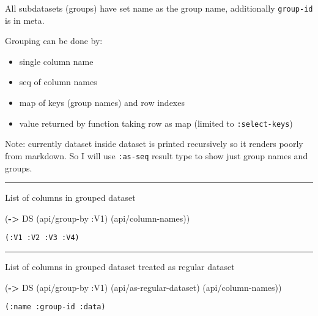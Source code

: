 \documentclass[]{article}
\newenvironment{Shaded}{\begin{snugshade}}{\end{snugshade}}
\newcommand{\KeywordTok}[1]{\textcolor[rgb]{0.13,0.29,0.53}{\textbf{#1}}}
\newcommand{\AttributeTok}[1]{\textcolor[rgb]{0.77,0.63,0.00}{#1}}
\newcommand{\NormalTok}[1]{#1}
\providecommand{\tightlist}{%
  \setlength{\itemsep}{0pt}\setlength{\parskip}{0pt}}
\begin{document}
All subdatasets (groups) have set name as the group name, additionally
\texttt{group-id} is in meta.

Grouping can be done by:

\begin{itemize}
\tightlist
\item
  single column name
\item
  seq of column names
\item
  map of keys (group names) and row indexes
\item
  value returned by function taking row as map (limited to
  \texttt{:select-keys})
\end{itemize}

Note: currently dataset inside dataset is printed recursively so it
renders poorly from markdown. So I will use \texttt{:as-seq} result type
to show just group names and groups.

\begin{center}\rule{0.5\linewidth}{0.5pt}\end{center}

List of columns in grouped dataset

\begin{Shaded}
\begin{Highlighting}[]
\NormalTok{(}\KeywordTok{->}\NormalTok{ DS}
\NormalTok{    (api/group-by }\AttributeTok{:V1}\NormalTok{)}
\NormalTok{    (api/column-names))}
\end{Highlighting}
\end{Shaded}

\begin{verbatim}
(:V1 :V2 :V3 :V4)
\end{verbatim}

\begin{center}\rule{0.5\linewidth}{0.5pt}\end{center}

List of columns in grouped dataset treated as regular dataset

\begin{Shaded}
\begin{Highlighting}[]
\NormalTok{(}\KeywordTok{->}\NormalTok{ DS}
\NormalTok{    (api/group-by }\AttributeTok{:V1}\NormalTok{)}
\NormalTok{    (api/as-regular-dataset)}
\NormalTok{    (api/column-names))}
\end{Highlighting}
\end{Shaded}

\begin{verbatim}
(:name :group-id :data)
\end{verbatim}
\end{document}
